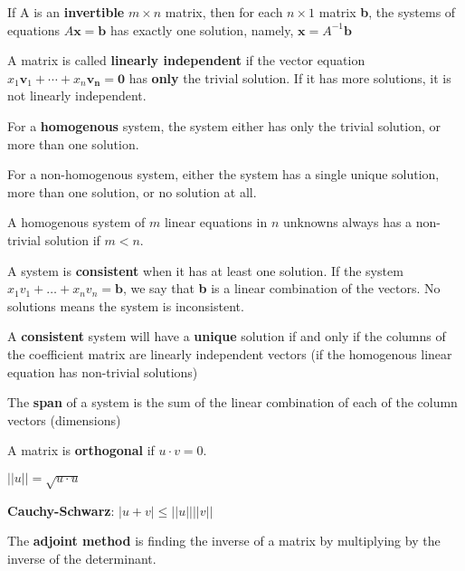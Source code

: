 \documentclass[11pt, letterpaper, twoside]{article}
\begin{document}
\vspace{2mm}
If A is an \textbf{invertible} \(m\times n\) matrix, then for each \(n\times1\) matrix \textbf{b}, the systems of equations \(A\textbf{x}=\textbf{b}\) has exactly one solution, namely, \(\textbf{x}=A^{-1}\textbf{b}\)

\vspace{2mm}
A matrix is called \textbf{linearly independent} if the vector equation \(x_1\mathbf{v}_1+\cdots+x_n\mathbf{v_n}=\mathbf{0}\) has \textbf{only} the trivial solution. If it has more solutions, it is not linearly independent.

\vspace{2mm}
For a \textbf{homogenous} system, the system either has only the trivial solution, or more than one solution.

\vspace{2mm}
For a non-homogenous system, either the system has a single unique solution, more than one solution, or no solution at all.

\vspace{2mm}
A homogenous system of \(m\) linear equations in \(n\) unknowns always has a non-trivial solution if \(m<n\).

\vspace{2mm}
A system is \textbf{consistent} when it has at least one solution. If the system \(x_1v_1+\dots + x_nv_n=\mathbf{b}\), we say that \textbf{b} is a linear combination of the vectors. No solutions means the system is inconsistent.

\vspace{2mm}
A \textbf{consistent} system will have a \textbf{unique} solution if and only if the columns of the coefficient matrix are linearly independent vectors (if the homogenous linear equation has non-trivial solutions)

\vspace{2mm}
The \textbf{span} of a system is the sum of the linear combination of each of the column vectors (dimensions)

\vspace{2mm}
A matrix is \textbf{orthogonal} if \(u\cdot v=0\).

\vspace{2mm}
\(||u||=\sqrt{u\cdot u}\)

\vspace{2mm}
\textbf{Cauchy-Schwarz}: \(|u+v|\leq ||u|| ||v||\)

\vspace{2mm}
The \textbf{adjoint method} is finding the inverse of a matrix by multiplying by the inverse of the determinant.
\end{document}

